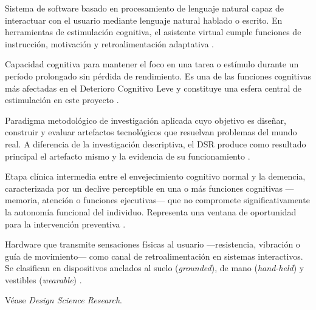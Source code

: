 \begin{description}[leftmargin=0pt, labelwidth=\textwidth, 
                    labelsep=0pt, style=nextline]
\item[\textbf{Asistente virtual (VA)}]
Sistema de software basado en procesamiento de lenguaje natural capaz de 
interactuar con el usuario mediante lenguaje natural hablado o escrito. 
En herramientas de estimulación cognitiva, el asistente virtual cumple 
funciones de instrucción, motivación y retroalimentación adaptativa 
\parencite{moret}.

\item[\textbf{Atención sostenida}]
Capacidad cognitiva para mantener el foco en una tarea o estímulo durante 
un período prolongado sin pérdida de rendimiento. Es una de las funciones 
cognitivas más afectadas en el Deterioro Cognitivo Leve y constituye una 
esfera central de estimulación en este proyecto \parencite{bermejo2021, 
AbdAlrazaq2022}.

\item[\textbf{Design Science Research (DSR)}]
Paradigma metodológico de investigación aplicada cuyo objetivo es diseñar, 
construir y evaluar artefactos tecnológicos que resuelvan problemas del 
mundo real. A diferencia de la investigación descriptiva, el DSR produce 
como resultado principal el artefacto mismo y la evidencia de su 
funcionamiento \parencite{Munoz2025}.

\item[\textbf{Deterioro Cognitivo Leve (DCL)}]
Etapa clínica intermedia entre el envejecimiento cognitivo normal y la 
demencia, caracterizada por un declive perceptible en una o más funciones 
cognitivas —memoria, atención o funciones ejecutivas— que no compromete 
significativamente la autonomía funcional del individuo. Representa una 
ventana de oportunidad para la intervención preventiva 
\parencite{Giovagnoli2024}.

\item[\textbf{Dispositivo háptico}]
Hardware que transmite sensaciones físicas al usuario —resistencia, 
vibración o guía de movimiento— como canal de retroalimentación en 
sistemas interactivos. Se clasifican en dispositivos anclados al suelo 
(\textit{grounded}), de mano (\textit{hand-held}) y vestibles 
(\textit{wearable}) \parencite{Adilkhanov2022}.

\item[\textbf{DSR}]
Véase \textit{Design Science Research}.


\end{description}
